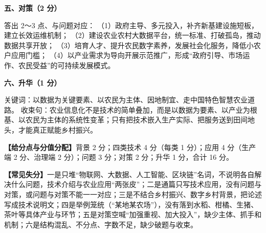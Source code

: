 \documentclass[a4paper,11pt]{article}
\begin{document}
\textbf{五、对策（2 分）}
\begin{analysis}
答出 2～3 点、与问题对应：
（1）政府主导、多元投入，补齐新基建设施短板，建立长效运维机制；
（2）建设农业农村大数据平台，统一标准、打破孤岛，推动数据共享开放；
（3）培育人才、提升农民数字素养，发展社会化服务，降低小农户应用门槛；
（4）以产业需求为导向开展示范推广，形成“政府引导、市场运作、农民受益”的可持续发展模式。
\end{analysis}

\textbf{六、升华（1 分）}
\begin{analysis}
关键词：以数据为关键要素、以农民为主体、因地制宜、走中国特色智慧农业道路。
收束句：农业信息化不是技术的简单叠加，而是以数据为要素、以产业为根基、以农民为主体的系统性变革；只有把技术嵌入生产实际、把服务送到田间地头，才能真正赋能乡村振兴。
\end{analysis}

\textbf{【给分点与分值分配】}背景 2 分；四类技术 4 分（每类 1 分）；应用 4 分（生产端 2 分、治理端 2 分）；问题 3 分；对策 2 分；升华 1 分，合计 16 分。

\textbf{【常见失分】}一是只堆“物联网、大数据、人工智能、区块链”名词，不说明各自解决什么问题，技术介绍与农业应用“两张皮”；二是通篇只写技术应用，没有问题与对策，或问题与对策不能一一对应；三是不结合乡村振兴、数字乡村背景，把论述写成技术说明文；四是举例笼统（“某地某农场”），没有落到水稻、柑橘、生猪、茶叶等具体产业与环节；五是对策空喊“加强重视、加大投入”，缺少主体、抓手和机制；六是结构混乱、不分点、字数不足，缺少破题与收束。
\end{document}
